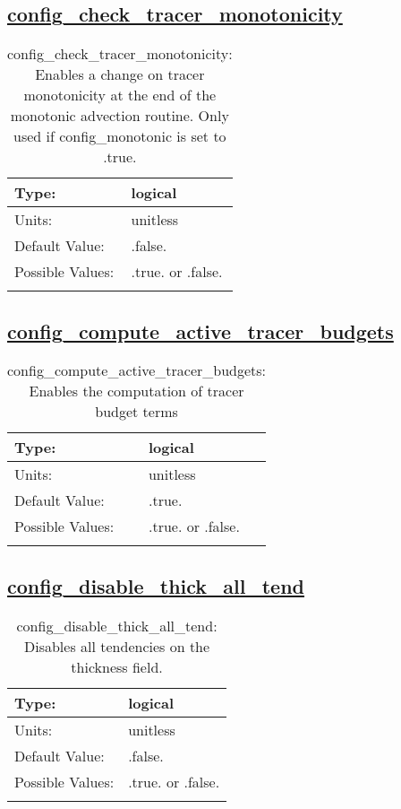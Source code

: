 \subsection[config\_check\_tracer\_monotonicity]{\hyperref[sec:nm_tab_debug]{config\_check\_tracer\_monotonicity}}
\label{subsec:nm_sec_config_check_tracer_monotonicity}
\begin{center}
\begin{longtable}{| p{2.0in} || p{4.0in} |}
    \hline
    Type: & logical \\
    \hline
    Units: & \si{unitless} \\
    \hline
    Default Value: & .false. \\
    \hline
    Possible Values: & .true. or .false. \\
    \hline
    \caption{config\_check\_tracer\_monotonicity: Enables a change on tracer monotonicity at the end of the monotonic advection routine. Only used if config\_monotonic is set to .true.}
\end{longtable}
\end{center}
\subsection[config\_compute\_active\_tracer\_budgets]{\hyperref[sec:nm_tab_debug]{config\_compute\_active\_tracer\_budgets}}
\label{subsec:nm_sec_config_compute_active_tracer_budgets}
\begin{center}
\begin{longtable}{| p{2.0in} || p{4.0in} |}
    \hline
    Type: & logical \\
    \hline
    Units: & \si{unitless} \\
    \hline
    Default Value: & .true. \\
    \hline
    Possible Values: & .true. or .false. \\
    \hline
    \caption{config\_compute\_active\_tracer\_budgets: Enables the computation of tracer budget terms}
\end{longtable}
\end{center}
\subsection[config\_disable\_thick\_all\_tend]{\hyperref[sec:nm_tab_debug]{config\_disable\_thick\_all\_tend}}
\label{subsec:nm_sec_config_disable_thick_all_tend}
\begin{center}
\begin{longtable}{| p{2.0in} || p{4.0in} |}
    \hline
    Type: & logical \\
    \hline
    Units: & \si{unitless} \\
    \hline
    Default Value: & .false. \\
    \hline
    Possible Values: & .true. or .false. \\
    \hline
    \caption{config\_disable\_thick\_all\_tend: Disables all tendencies on the thickness field.}
\end{longtable}
\end{center}
